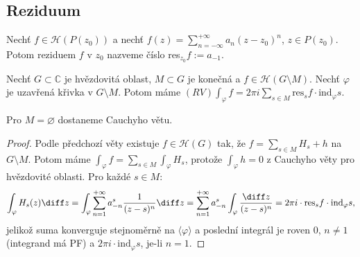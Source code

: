 \subsection{Reziduum}
\begin{definition}
Nechť $f \in \mathcal{H}(P(z_0))$ a nechť $f(z)=\sum\limits_{n=-\infty}^{+\infty}a_n(z-z_0)^n$, $z\in P(z_0)$. Potom reziduem $f$ v $z_0$ nazveme číslo res$_{z_0}f:=a_{-1}$.
\end{definition}

\begin{theorem}
Nechť $G \subset \mathbb{C}$ je hvězdovitá oblast, $M \subset G$ je konečná a $f \in \mathcal{H}(G \setminus M)$. Nechť $\varphi$ je uzavřená křivka v $G \setminus M$. Potom máme $(RV) \int_\varphi f=2\pi i \sum\limits_{s\in M}\text{res}_sf \cdot \text{ind}_\varphi s$.
\end{theorem}

\begin{note*}
Pro $M=\varnothing$ dostaneme Cauchyho větu.
\end{note*}

\begin{proof}
Podle předchozí věty existuje $f \in \mathcal{H}(G)$ tak, že $f=\sum\limits_{s\in M}H_s+h$ na $G \setminus M$. Potom máme $\int_\varphi f=\sum\limits_{s\in M}\int_\varphi H_s$, protože $\int_\varphi h =0$ z Cauchyho věty pro hvězdovité oblasti. Pro každé $s \in M$:
$$
\int_\varphi H_s(z) \diff z=\int_\varphi \sum\limits_{n=1}^{+\infty}a_{-n}^s\frac{1}{(z-s)^n} \diff z = \sum\limits_{n=1}^{+\infty}a_{-n}^s \int_\varphi \frac{\diff z}{(z-s)^n}=2\pi i \cdot \text{res}_sf\cdot \text{ind}_\varphi s\text{,}
$$
jelikož suma konverguje stejnoměrně na $\langle\varphi \rangle$ a poslední integrál je roven $0$, $n \neq 1$ (integrand má PF) a $2 \pi i \cdot \text{ind}_\varphi s$, je-li $n=1$.
\end{proof}
